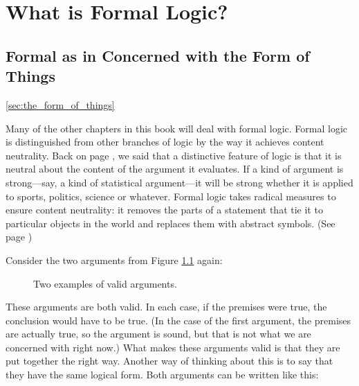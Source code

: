 \chapter{What is Formal Logic?}\label{ch:whatisformallogic}

\section{Formal as in Concerned with the Form of Things}\ref{sec:the_form_of_things}

Many of the other chapters in this book will deal with formal logic. Formal logic is distinguished from other branches of logic by the way it achieves content neutrality. Back on page \pageref{def:content_neutrality}, we said that a distinctive feature of logic is that it is neutral about the content of the argument it evaluates. If a kind of argument is strong---say, a kind of statistical argument---it will be strong whether it is applied to sports, politics, science or whatever. Formal logic takes radical measures to ensure content neutrality: it removes the parts of a statement that tie it to particular objects in the world and replaces them with abstract symbols. (See page \pageref{def:formal_logic})

Consider the two arguments from Figure \ref{fig:valid_sound} again:

\begin{figure}
\begin{multicols}{2}
\begin{kormanize}
\end{kormanize}

\begin{kormanize}
\end{kormanize}
\end{multicols}
\label{fig:valid_sound}
\caption{Two examples of valid arguments.}
\end{figure}

These arguments are both valid. In each case, if the premises were true, the conclusion would have to be true. (In the case of the first argument, the premises are actually true, so the argument is sound, but that is not what we are concerned with right now.) What makes these arguments valid is that they are put together the right way. Another way of thinking about this is to say that they have the same logical form. Both arguments can be written like this:

